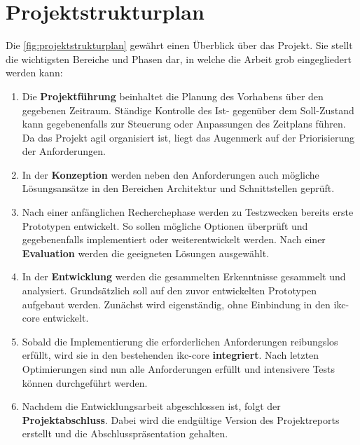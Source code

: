 \section{Projektstrukturplan}
Die \autoref{fig:projektstrukturplan} gewährt einen Überblick über das Projekt. Sie stellt die wichtigsten Bereiche und Phasen dar, in welche die Arbeit grob eingegliedert werden kann:
\begin{enumerate}
    \item Die \textbf{Projektführung} beinhaltet die Planung des Vorhabens über den gegebenen Zeitraum. Ständige Kontrolle des Ist- gegenüber dem Soll-Zustand kann gegebenenfalls zur Steuerung oder Anpassungen des Zeitplans führen. Da das Projekt agil organisiert ist, liegt das Augenmerk auf der Priorisierung der Anforderungen.
    \item In der \textbf{Konzeption} werden neben den Anforderungen auch mög\-li\-che Lös\-ungs\-an\-sätz\-e in den Bereichen Architektur und Schnittstellen geprüft.
    \item Nach einer anfänglichen Recherchephase werden zu Testzwecken bereits erste Prototypen entwickelt. So sollen mögliche Optionen überprüft und gegebenenfalls implementiert oder weiterentwickelt werden. Nach einer \textbf{Evaluation} werden die geeigneten Lösungen ausgewählt.
    \item In der \textbf{Entwicklung} werden die gesammelten Erkenntnisse gesammelt und analysiert. Grundsätzlich soll auf den zuvor entwickelten Prototypen aufgebaut werden. Zunächst wird eigenständig, ohne Einbindung in den \gls{ikc-core} entwickelt.
    \item Sobald die Implementierung die erforderlichen Anforderungen reibungslos erfüllt, wird sie in den bestehenden \gls{ikc-core} \textbf{integriert}. Nach letzten Optimierungen sind nun alle Anforderungen erfüllt und intensivere Tests können durchgeführt werden.
    \item Nachdem die Entwicklungsarbeit abgeschlossen ist, folgt der \textbf{Projektabschluss}. Dabei wird die endgültige Version des Projektreports erstellt und die Abschlusspräsentation gehalten.
\end{enumerate}

